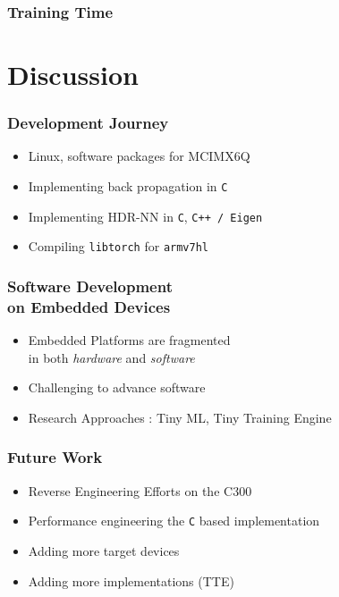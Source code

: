 \documentclass{beamer}
\begin{document}
\begin{frame}
  \frametitle{Training Time}

  \begin{figure}[!ht]
    \centering
    \resizebox{\columnwidth}{!}{%
    }
  \end{figure}

\end{frame}

\section{Discussion}

\begin{frame}
  \frametitle{Development Journey}

  \begin{itemize}
    \item Linux, software packages for MCIMX6Q
    \item Implementing back propagation in \texttt{C}
    \item Implementing HDR-NN in \texttt{C}, \texttt{C++ / Eigen}
    \item Compiling \texttt{libtorch} for \texttt{armv7hl}
  \end{itemize}

\end{frame}

\begin{frame}
  \frametitle{Software Development \\ on Embedded Devices}

  \begin{itemize}
    \item Embedded Platforms are fragmented \\ in both \textit{hardware} and \textit{software}
    \item Challenging to advance software
    \item Research Approaches : Tiny ML, Tiny Training Engine
  \end{itemize}

\end{frame}

\begin{frame}
  \frametitle{Future Work}

  \begin{itemize}
    \item Reverse Engineering Efforts on the C300
    \item Performance engineering the \texttt{C} based implementation
    \item Adding more target devices
    \item Adding more implementations (TTE)
  \end{itemize}

\end{frame}
\end{document}
